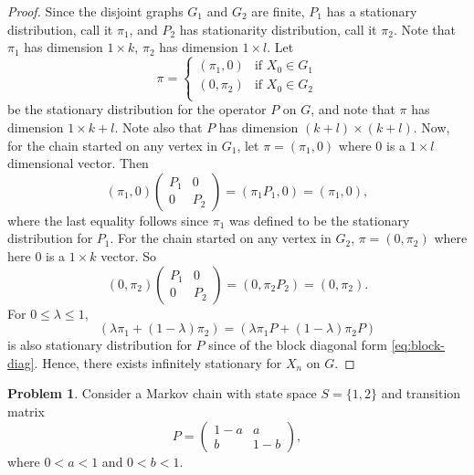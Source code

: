 \documentclass[oneside,reqno]{amsart}
\theoremstyle{definition}
\newtheorem{prob}{Problem}
\begin{document}
\begin{enumerate}
\begin{proof}
Since the disjoint graphs $G_1$ and $G_2$ are finite, $P_1$ has a stationary distribution, call it $\pi_1$, and $P_2$ has stationarity distribution, call it $\pi_2$. Note that $\pi_1$ has dimension $1\times k$, $\pi_2$ has dimension $1 \times l$. Let 
\[
	\pi = \begin{cases}
		(\pi_1, 0) & \text{if } X_0  \in G_1 \\
		(0, \pi_2) & \text{if } X_0  \in G_2 \\ 
	\end{cases}
\] 
be the stationary distribution for the operator $P$ on $G$, and note that $\pi$ has dimension $1 \times k+l$. Note also that $P$ has dimension $(k+l) \times (k+l)$. Now, for the chain started on any vertex in $G_1$, let $\pi = (\pi_1, 0)$ where $0$ is a $1 \times l$ dimensional vector. Then 
\[
	(\pi_1, 0)
	\begin{pmatrix}
		P_1 & 0 \\
		0 & P_2 
	\end{pmatrix} 
	=(\pi_1 P_1, 0)
	= (\pi_1, 0),
\] 
where the last equality follows since $\pi_1$ was defined to be the stationary distribution for $P_1$. For the chain started on any vertex in $G_2$, $\pi =  (0,\pi_2)$ where here $0$ is a $1 \times k$ vector. So
\[
	(0, \pi_2)
	\begin{pmatrix}
		P_1 & 0 \\
		0 & P_2 
	\end{pmatrix} 
	= (0, \pi_2 P_2)
	=(0, \pi_2).
\]
For $0 \leq \lambda \leq 1$,
\[
	( \lambda \pi_1 + (1-\lambda) \pi_2 ) = ( \lambda \pi_1 P + (1-\lambda) \pi_2 P)
\]
is also stationary distribution for $P$ since of the block diagonal form \eqref{eq:block-diag}. Hence, there exists infinitely stationary for $X_n$ on $G$. 
\end{proof}
\end{enumerate}

\begin{prob}
Consider a Markov chain with state space $S=\{1,2\}$ and transition matrix 
\[
	P = \begin{pmatrix}
		1-a & a \\
		b & 1-b
	\end{pmatrix},
\]
where $0<a<1$ and $0<b<1$. 
\end{prob}
\end{document}
